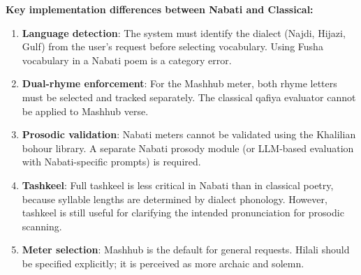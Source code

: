 \begin{implnote}
\textbf{Key implementation differences between Nabati and Classical:}
\begin{enumerate}
  \item \textbf{Language detection}: The system must identify the dialect (Najdi, Hijazi, Gulf) from the user's request before selecting vocabulary. Using Fusha vocabulary in a Nabati poem is a category error.
  \item \textbf{Dual-rhyme enforcement}: For the Mashhub meter, both rhyme letters must be selected and tracked separately. The classical qafiya evaluator cannot be applied to Mashhub verse.
  \item \textbf{Prosodic validation}: Nabati meters cannot be validated using the Khalilian bohour library. A separate Nabati prosody module (or LLM-based evaluation with Nabati-specific prompts) is required.
  \item \textbf{Tashkeel}: Full tashkeel is less critical in Nabati than in classical poetry, because syllable lengths are determined by dialect phonology. However, tashkeel is still useful for clarifying the intended pronunciation for prosodic scanning.
  \item \textbf{Meter selection}: Mashhub is the default for general requests. Hilali should be specified explicitly; it is perceived as more archaic and solemn.
\end{enumerate}
\end{implnote}

\clearpage
\langsep{}

